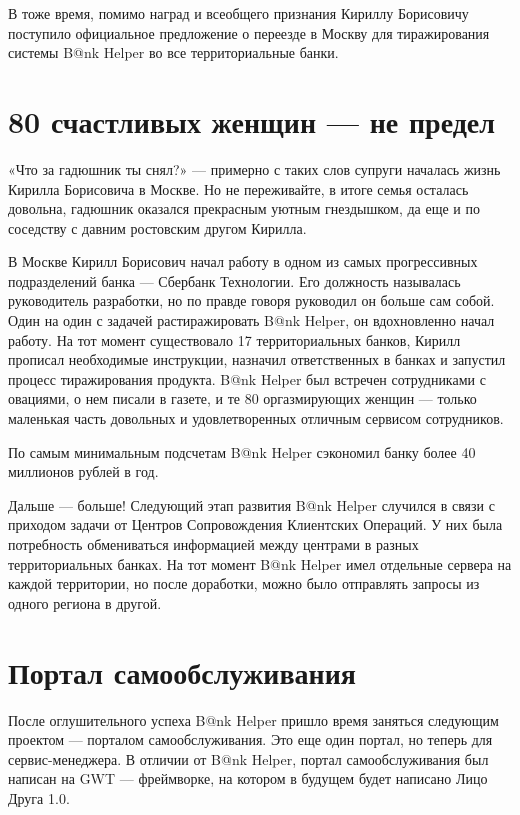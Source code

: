 \documentclass[../index.tex]{subfiles}
\begin{document}
В тоже время, помимо наград и всеобщего признания  Кириллу Борисовичу поступило официальное предложение о переезде в Москву для тиражирования  системы B@nk Helper во все территориальные банки.

\section{80 счастливых женщин — не предел}

«Что за гадюшник ты снял?» — примерно с таких слов супруги началась жизнь Кирилла Борисовича в Москве. Но не переживайте, в итоге семья осталась довольна, гадюшник оказался прекрасным уютным гнездышком, да еще и по соседству с давним ростовским другом Кирилла.

В Москве Кирилл Борисович начал работу в одном из самых прогрессивных подразделений банка — Сбербанк Технологии. Его должность называлась руководитель разработки, но по правде говоря руководил он больше сам собой.  Один на один с задачей растиражировать B@nk Helper, он вдохновленно начал работу. На тот момент существовало 17 территориальных банков, Кирилл прописал необходимые инструкции, назначил ответственных в банках и запустил процесс тиражирования продукта. B@nk Helper был встречен сотрудниками с овациями, о нем писали в газете, и те 80 оргазмирующих женщин — только маленькая часть  довольных и удовлетворенных отличным сервисом сотрудников.

По самым минимальным подсчетам B@nk Helper сэкономил банку более 40 миллионов рублей в год. 

Дальше — больше! Следующий этап развития B@nk Helper случился в связи с приходом задачи от Центров Сопровождения Клиентских Операций. У них была потребность обмениваться информацией между центрами в разных территориальных банках. На тот момент B@nk Helper имел отдельные сервера на каждой территории, но после доработки, можно было отправлять запросы из одного региона в другой.

\section{Портал самообслуживания}

После оглушительного успеха  B@nk Helper пришло время заняться следующим проектом — порталом самообслуживания. Это еще один портал, но теперь для сервис-менеджера. 
В отличии от B@nk Helper, портал самообслуживания был написан на GWT — фреймворке, на котором в будущем будет написано Лицо Друга 1.0. 
\end{document}
